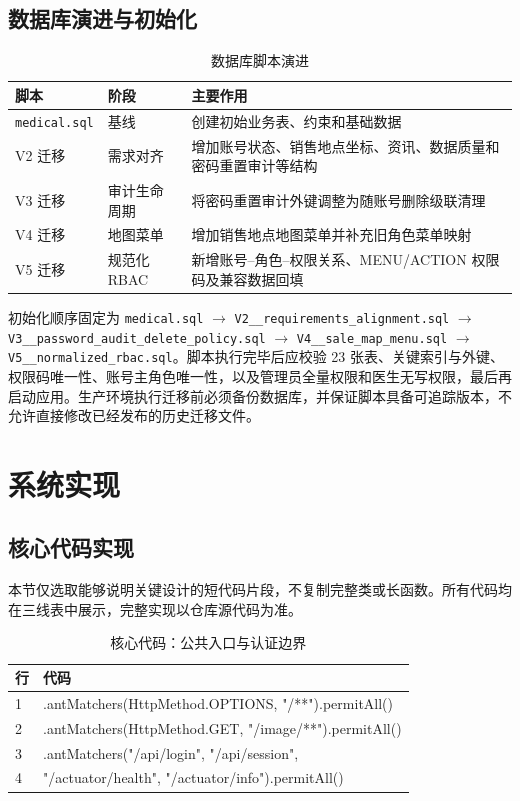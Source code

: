 \documentclass[UTF8,a4paper,12pt,openany,fontset=windows]{ctexrep}
\newcommand{\codefont}{\ttfamily\footnotesize}
\begin{document}
\section{数据库演进与初始化}

\begin{table}[H]
  \centering
  \caption{数据库脚本演进}
  \begin{tabularx}{\textwidth}{p{3.2cm}p{3.0cm}L}
    \toprule
    脚本 & 阶段 & 主要作用 \\
    \midrule
    \texttt{medical.sql} & 基线 & 创建初始业务表、约束和基础数据 \\
    V2 迁移 & 需求对齐 & 增加账号状态、销售地点坐标、资讯、数据质量和密码重置审计等结构 \\
    V3 迁移 & 审计生命周期 & 将密码重置审计外键调整为随账号删除级联清理 \\
    V4 迁移 & 地图菜单 & 增加销售地点地图菜单并补充旧角色菜单映射 \\
    V5 迁移 & 规范化 RBAC & 新增账号--角色--权限关系、MENU/ACTION 权限码及兼容数据回填 \\
    \bottomrule
  \end{tabularx}
\end{table}

初始化顺序固定为 \texttt{medical.sql} $\rightarrow$ \texttt{V2\_\_requirements\_alignment.sql} $\rightarrow$ \texttt{V3\_\_password\_audit\_delete\_policy.sql} $\rightarrow$ \texttt{V4\_\_sale\_map\_menu.sql} $\rightarrow$ \texttt{V5\_\_normalized\_rbac.sql}。脚本执行完毕后应校验 23 张表、关键索引与外键、权限码唯一性、账号主角色唯一性，以及管理员全量权限和医生无写权限，最后再启动应用。生产环境执行迁移前必须备份数据库，并保证脚本具备可追踪版本，不允许直接修改已经发布的历史迁移文件。

\chapter{系统实现}

\section{核心代码实现}

本节仅选取能够说明关键设计的短代码片段，不复制完整类或长函数。所有代码均在三线表中展示，完整实现以仓库源代码为准。

\begin{table}[H]
  \centering
  \caption{核心代码：公共入口与认证边界}
  \begin{tabularx}{\textwidth}{p{1.2cm}L}
    \toprule
    行 & 代码 \\
     & \codefont .antMatchers(HttpMethod.OPTIONS, "/**").permitAll() \\
    2 & \codefont .antMatchers(HttpMethod.GET, "/image/**").permitAll() \\
    3 & \codefont .antMatchers("/api/login", "/api/session", \\
    4 & \codefont \quad "/actuator/health", "/actuator/info").permitAll() \\
    \bottomrule
  \end{tabularx}
\end{table}
\end{document}
